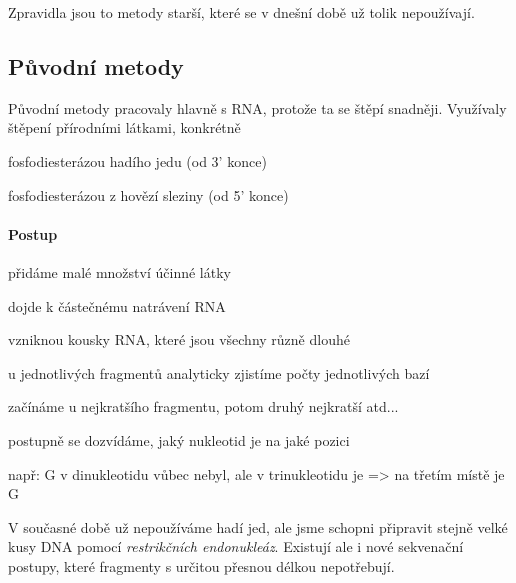 \documentclass[DIV=8]{scrreprt}
\begin{document}
Zpravidla jsou to metody starší, které se v dnešní době už tolik nepoužívají.

\subsection{Původní metody} \label{Původní metody}


Původní metody pracovaly hlavně s RNA, protože ta se štěpí snadněji. Využívaly štěpení přírodními látkami, konkrétně
\begin{myItemize}[nosep]
    \item fosfodiesterázou hadího jedu (od 3' konce)
    \item fosfodiesterázou z hovězí sleziny (od 5' konce)
\end{myItemize}



\paragraph{Postup}
\begin{myEnumerate}[nosep]
    \item přidáme malé množství účinné látky
    \item dojde k částečnému natrávení RNA
\begin{myItemize}[nosep]
    \item vzniknou kousky RNA, které jsou všechny různě dlouhé
\end{myItemize}

    \item u jednotlivých fragmentů analyticky zjistíme počty jednotlivých bazí
\begin{myItemize}[nosep]
    \item začínáme u nejkratšího fragmentu, potom druhý nejkratší atd...
    \item postupně se dozvídáme, jaký nukleotid je na jaké pozici
    \item např: G v dinukleotidu vůbec nebyl, ale v trinukleotidu je => na třetím místě je G
\end{myItemize}

\end{myEnumerate}



V současné době už nepoužíváme hadí jed, ale jsme schopni připravit stejně velké kusy DNA pomocí \emph{restrikčních endonukleáz}. Existují ale i nové sekvenační postupy, které fragmenty s určitou přesnou délkou nepotřebují.
\end{document}
